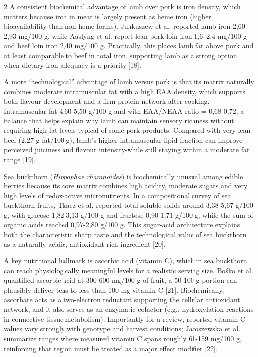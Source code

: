 \begin{multicols}{2}
A consistent biochemical advantage of lamb over pork is iron density,
which matters because iron in meat is largely present as heme iron
(higher bioavailability than non-heme forms). Junkuszew et al. reported
lamb iron 2,60-2,93 mg/100 g, while Aaslyng et al. report lean pork loin
iron 1,6--2,4 mg/100 g and beef loin iron 2,40 mg/100 g. Practically,
this places lamb far above pork and at least comparable to beef in total
iron, supporting lamb as a strong option when dietary iron adequacy is a
priority {[}18{]}.

A more ``technological'' advantage of lamb versus pork is that its
matrix naturally combines moderate intramuscular fat with a high EAA
density, which supports both flavour development and a firm protein
network after cooking. Intramuscular fat 4,60-5,50 g/100 g and with
EAA/NEAA ratio = 0,68-0,72, a balance that helps explain why lamb can
maintain sensory richness without requiring high fat levels typical of
some pork products. Compared with very lean beef (2,27 g fat/100 g),
lamb's higher intramuscular lipid fraction can improve perceived
juiciness and flavour intensity-while still staying within a moderate
fat range {[}19{]}.

Sea buckthorn (\emph{Hippophae rhamnoides}) is biochemically unusual
among edible berries because its core matrix combines high acidity,
moderate sugars and very high levels of redox-active micronutrients. In
a compositional survey of sea buckthorn fruits, Tkacz et al. reported
total soluble solids around 3,38-5,67 g/100 g, with glucose 1,82-3,13
g/100 g and fructose 0,90-1,71 g/100 g, while the sum of organic acids
reached 0,97-2,80 g/100 g. This sugar-acid architecture explains both
the characteristic sharp taste and the technological value of sea
buckthorn as a naturally acidic, antioxidant-rich ingredient {[}20{]}.

A key nutritional hallmark is ascorbic acid (vitamin C), which in sea
buckthorn can reach physiologically meaningful levels for a realistic
serving size. Bośko et al. quantified ascorbic acid at 300-600
mg/100 g of fruit, a 50-100 g portion can plausibly deliver tens to less
than 100 mg vitamin C {[}21{]}. Biochemically, ascorbate acts as a
two-electron reductant supporting the cellular antioxidant network, and
it also serves as an enzymatic cofactor (e.g., hydroxylation reactions
in connective-tissue metabolism). Importantly for a review, reported
vitamin C values vary strongly with genotype and harvest conditions;
Jaroszewska et al. summarize ranges where measured vitamin C spans
roughly 61-159 mg/100 g, reinforcing that region must be treated as a
major effect modifier {[}22{]}.


\end{multicols}
